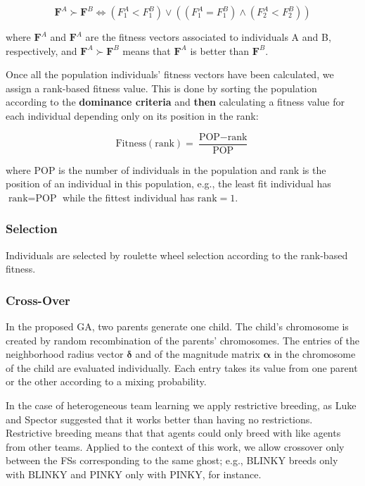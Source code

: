 \documentclass[journal]{IEEEtran}
\begin{document}
\begin{equation}
\label{eq:ordering}
	\mathbf{F}^A \succ \mathbf{F}^B \iff (F_1^A < F_1^B) \lor ((F_1^A = F_1^B) \land (F_2^A < F_2^B))
\end{equation}

where $\mathbf{F}^A$ and $\mathbf{F}^A$ are the fitness vectors associated to individuals A and B, respectively, and $\mathbf{F}^A \succ \mathbf{F}^B$ means that $\mathbf{F}^A$ is better than $\mathbf{F}^B$.

Once all the population individuals' fitness vectors have been calculated, we assign a rank-based fitness value. This is done by sorting the population according to the \textbf{dominance criteria} and \textbf{then} calculating a fitness value for each individual depending only on its position in the rank:

\begin{equation}
\label{eq:rankFitness}
	\text{Fitness}(\text{rank}) = \frac{\text{POP} - \text{rank}}{\text{POP}}
\end{equation}

where POP is the number of individuals in the population and rank is the position of an individual in this population, e.g., the least fit individual has $\text{rank} = \text{POP}$ while the fittest individual has $\text{rank} = 1$.

\subsubsection{Selection}
Individuals are selected by roulette wheel selection according to the rank-based fitness.

\subsubsection{Cross-Over}
In the proposed GA, two parents generate one child. The child's chromosome is created by random recombination of the parents' chromosomes. The entries of the neighborhood radius vector $\boldsymbol\delta$ and of the magnitude matrix $\boldsymbol\alpha$ in the chromosome of the child are evaluated individually. Each entry takes its value from one parent or the other according to a mixing probability.

In the case of heterogeneous team learning we apply restrictive
breeding, as Luke and Spector \cite{Luke1996} suggested that it works
better than having no restrictions. Restrictive breeding means that
that agents could only breed with like agents from other
teams. Applied to the context of this work, we allow crossover only
between the FSs corresponding to the same ghost; e.g., BLINKY breeds
only with BLINKY and PINKY only with PINKY, for instance.
\end{document}
